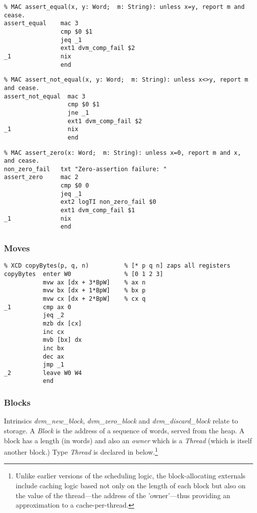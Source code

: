 {\small
\begin{verbatim}
% MAC assert_equal(x, y: Word;  m: String): unless x=y, report m and cease.
assert_equal    mac 3
                cmp $0 $1
                jeq _1
                ext1 dvm_comp_fail $2
_1              nix
                end
\end{verbatim}}

{\small
\begin{verbatim}
% MAC assert_not_equal(x, y: Word;  m: String): unless x<>y, report m and cease.
assert_not_equal  mac 3
                  cmp $0 $1
                  jne _1
                  ext1 dvm_comp_fail $2
_1                nix
                  end
\end{verbatim}}

{\small
\begin{verbatim}
% MAC assert_zero(x: Word;  m: String): unless x=0, report m and x, and cease.
non_zero_fail   txt "Zero-assertion failure: "
assert_zero     mac 2
                cmp $0 0
                jeq _1
                ext2 logTI non_zero_fail $0
                ext1 dvm_comp_fail $1
_1              nix
                end
\end{verbatim}}



\subsubsection{Moves}
\begin{tabbing}
\indents
{}
\fin
\end{tabbing}

{\small
\begin{verbatim}
% XCD copyBytes(p, q, n)          % [* p q n] zaps all registers
copyBytes  enter W0               % [0 1 2 3]
           mvw ax [dx + 3*BpW]    % ax n
           mvw bx [dx + 1*BpW]    % bx p
           mvw cx [dx + 2*BpW]    % cx q
_1         cmp ax 0
           jeq _2
           mzb dx [cx]
           inc cx
           mvb [bx] dx
           inc bx
           dec ax
           jmp _1
_2         leave W0 W4
           end
\end{verbatim}}


\subsubsection{Blocks}
Intrinsics \emph{dvm\_new\_block}, \emph{dvm\_zero\_block} and \emph{dvm\_discard\_block} relate to storage. A \emph{Block} is the address of a sequence of words, served from the heap. A block has a length (in words) and also an \emph{owner} which is a \emph{Thread} (which is itself another block.) Type \emph{Thread} is declared in  below.\footnote{Unlike earlier versions of the scheduling logic, the block-allocating externals include caching logic based not only on the length of each block but also on the value of the thread---the address of the 'owner'---thus providing an approximation to a cache-per-thread.}

